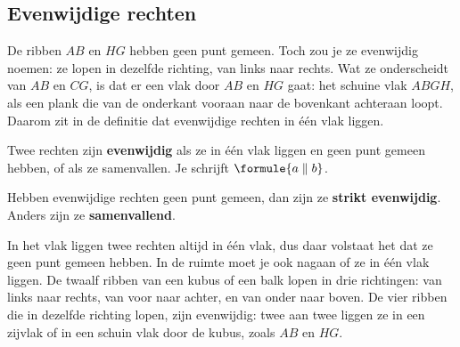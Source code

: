 \begin{oefeningen}
\end{oefeningen}

\subsection{Evenwijdige rechten}

De ribben $AB$ en $HG$ hebben geen punt gemeen. Toch zou je ze evenwijdig noemen: ze lopen in dezelfde richting, van links naar rechts. Wat ze onderscheidt van $AB$ en $CG$, is dat er een vlak door $AB$ en $HG$ gaat: het schuine vlak $ABGH$, als een plank die van de onderkant vooraan naar de bovenkant achteraan loopt. Daarom zit in de definitie dat evenwijdige rechten in één vlak liggen.

\begin{theorie}
Twee rechten zijn \textbf{\textcolor{accent}{evenwijdig}} als ze in één vlak liggen en geen punt gemeen hebben, of als ze samenvallen. Je schrijft $\formule{a \parallel b}$.

Hebben evenwijdige rechten geen punt gemeen, dan zijn ze \textbf{\textcolor{accent}{strikt evenwijdig}}. Anders zijn ze \textbf{\textcolor{accent}{samenvallend}}.
\end{theorie}

In het vlak liggen twee rechten altijd in één vlak, dus daar volstaat het dat ze geen punt gemeen hebben. In de ruimte moet je ook nagaan of ze in één vlak liggen. De twaalf ribben van een kubus of een balk lopen in drie richtingen: van links naar rechts, van voor naar achter, en van onder naar boven. De vier ribben die in dezelfde richting lopen, zijn evenwijdig: twee aan twee liggen ze in een zijvlak of in een schuin vlak door de kubus, zoals $AB$ en $HG$.


